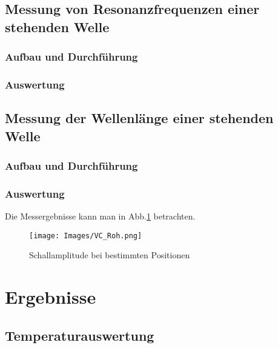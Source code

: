 \documentclass[]{article}
\begin{document}
	
	\subsection{Messung von Resonanzfrequenzen einer stehenden Welle}
	\subsubsection{Aufbau und Durchführung}
	\subsubsection{Auswertung}
	
	\subsection{Messung der Wellenlänge einer stehenden Welle}
	\subsubsection{Aufbau und Durchführung}
	\subsubsection{Auswertung}
	Die Messergebnisse kann man in Abb.\ref{Vc_Roh} betrachten.
	
	\begin{figure}
	\begin{center}
		\texttt{[image: Images/VC\_Roh.png]}
		\caption{Schallamplitude bei bestimmten Positionen}
		\label{Vc_Roh}
	\end{center}
	\end{figure}
	
	
	\section{Ergebnisse}
	\subsection{Temperaturauswertung}
	
\end{document}
